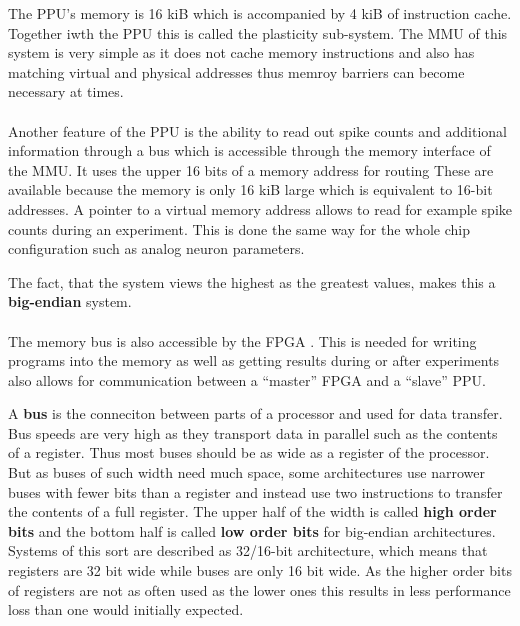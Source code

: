 The PPU's memory is 16 kiB which is accompanied by 4 kiB of instruction cache.
Together iwth the PPU this is called the plasticity sub-system.
The MMU of this system is very simple as it does not cache memory instructions and also has matching virtual and physical addresses thus memroy barriers can become necessary at times.
\\
\\
Another feature of the PPU is the ability to read out spike counts and additional information through a bus which is accessible through the memory interface of the MMU.
It uses the upper 16 bits of a memory address for routing
These are available because the memory is only 16 kiB large which is equivalent to 16-bit addresses.
A pointer to a virtual memory address allows to read for example spike counts during an experiment.
This is done the same way for the whole chip configuration such as analog neuron parameters.

The fact, that the system views the highest as the greatest values, makes this a \textbf{big-endian} system.
\\
\\
The memory bus is also accessible by the FPGA .
This is needed for writing programs into the memory as well as getting results during or after experiments also allows for communication between a ``master'' FPGA and a ``slave'' PPU.

A \textbf{bus} is the conneciton between parts of a processor and used for data transfer.
Bus speeds are very high as they transport data in parallel such as the contents of a register.
Thus most buses should be as wide as a register of the processor.
But as buses of such width need much space, some architectures use narrower buses with fewer bits than a register and instead use two instructions to transfer the contents of a full register.
The upper half of the width is called \textbf{high order bits} and the bottom half is called \textbf{low order bits} for big-endian architectures.
Systems of this sort are described as 32/16-bit architecture, which means that registers are 32 bit wide while buses are only 16 bit wide.
As the higher order bits of registers are not as often used as the lower ones this results in less performance loss than one would initially expected.

